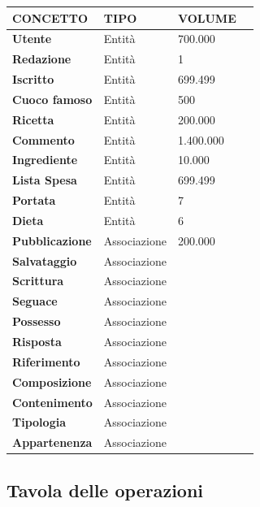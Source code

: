 \documentclass[12pt]{extarticle}
\begin{document}
\vspace{2cm}
    \begin{tabularx}{\textwidth}{X|X|X|X}
    \bfseries CONCETTO     & \bfseries TIPO  & \bfseries VOLUME \\ 
    \hline\hline
    \bfseries Utente        & Entità        &   700.000 \\ 
    \hline
    \bfseries Redazione     & Entità        & 1 \\
    \hline
    \bfseries Iscritto      & Entità        & 699.499 \\
    \hline
    \bfseries Cuoco famoso  & Entità        & 500 \\
    \hline
    \bfseries Ricetta       & Entità        & 200.000 \\
    \hline
    \bfseries Commento      & Entità        & 1.400.000 \\
    \hline
    \bfseries Ingrediente   & Entità        & 10.000 \\
    \hline
    \bfseries Lista Spesa   & Entità        & 699.499 \\
    \hline
    \bfseries Portata       & Entità        & 7 \\
    \hline
    \bfseries Dieta         & Entità        & 6 \\
    \hline
    \bfseries Pubblicazione & Associazione  & 200.000 \\
    \hline
    \bfseries Salvataggio   & Associazione  &  \\
    \hline
    \bfseries Scrittura     & Associazione  &  \\
    \hline
    \bfseries Seguace       & Associazione  &  \\
    \hline
    \bfseries Possesso      & Associazione  &  \\
    \hline
    \bfseries Risposta      & Associazione  &  \\
    \hline
    \bfseries Riferimento   & Associazione  &  \\
    \hline
    \bfseries Composizione  & Associazione  &  \\
    \hline
    \bfseries Contenimento  & Associazione  &  \\
    \hline
    \bfseries Tipologia     & Associazione  &  \\
    \hline
    \bfseries Appartenenza  & Associazione  &  \\
    \hline
    \end{tabularx}

\newpage

\subsection{Tavola delle operazioni}
\end{document}

